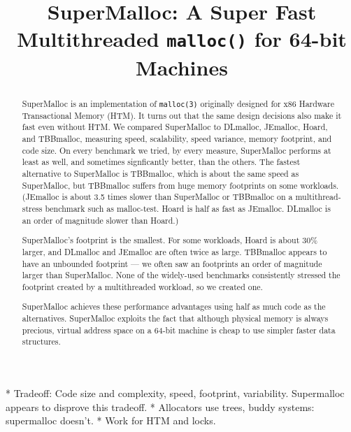 \documentclass[pldi]{sigplanconf-pldi15}
\begin{document}
\title{SuperMalloc: A Super Fast Multithreaded \texttt{malloc()} for 64-bit Machines}
\date{}
\maketitle
\begin{abstract}
SuperMalloc is an implementation of \texttt{malloc(3)} originally
designed for x86 Hardware Transactional Memory (HTM).  It turns out
that the same design decisions also make it fast even without HTM\@.  We
compared SuperMalloc to DLmalloc, JEmalloc, Hoard, and TBBmalloc,
measuring speed, scalability, speed variance, memory footprint, and
code size.  On every benchmark we tried, by every measure, SuperMalloc
performs at least as well, and sometimes signficantly better, than the
others.  The fastest alternative to SuperMalloc is TBBmalloc, which is
about the same speed as SuperMalloc, but TBBmalloc suffers from huge
memory footprints on some workloads.  (JEmalloc is about 3.5 times
slower than SuperMalloc or TBBmalloc on a multithread-stress benchmark
such as malloc-test. Hoard is half as fast as JEmalloc. DLmalloc is an
order of magnitude slower than Hoard.)

SuperMalloc's footprint is the smallest.  For some workloads, Hoard is
about 30\% larger, and DLmalloc and JEmalloc are often twice as large.
TBBmalloc appears to have an unbounded footprint --- we often saw an
footprints an order of magnitude larger than SuperMalloc.  None of the
widely-used benchmarks consistently stressed the footprint created by
a multithreaded workload, so we created one.

SuperMalloc achieves these performance advantages using half as much
code as the alternatives.  SuperMalloc exploits the fact that although
physical memory is always precious, virtual address space on a 64-bit
machine is cheap to use simpler faster data structures.
\end{abstract}




* Tradeoff: Code size and complexity, speed, footprint, variability.  Supermalloc appears to disprove this tradeoff.
* Allocators use trees, buddy systems: supermalloc doesn't.
* Work for HTM and locks.
\end{document}
